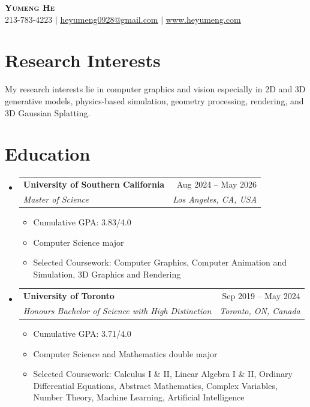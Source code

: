 \documentclass[letterpaper,11pt]{article}
\newcommand{\resumeItem}[1]{
  \item\small{
    {#1 \vspace{-2pt}}
  }
}
\newcommand{\resumeSubheading}[4]{
  \vspace{-2pt}\item
    \begin{tabularx}{\textwidth}[t]{X r}
      \textbf{#1} & #2 \\
      \textit{\small#3} & \textit{\small #4} \\
    \end{tabularx}\vspace{-7pt}
}
\newcommand{\resumeSubHeadingListStart}{\begin{itemize}[leftmargin=0in, label={}]}
\newcommand{\resumeSubHeadingListEnd}{\end{itemize}}
\newcommand{\resumeItemListStart}{\begin{itemize}}
\newcommand{\resumeItemListEnd}{\end{itemize}\vspace{-5pt}}
\begin{document}

\begin{center}
    \textbf{\Huge \scshape Yumeng He} \\ \vspace{1pt}
    \small 213-783-4223 $|$ \href{mailto:heyumeng0928@gmail.com}{\underline{heyumeng0928@gmail.com}} $|$ 
    \href{https://www.heyumeng.com} 
    {\underline{www.heyumeng.com}}
\end{center}

\section{Research Interests}
My research interests lie in computer graphics and vision especially in 
2D and 3D generative models, 
physics-based simulation, 
geometry processing,
rendering,
and 3D Gaussian Splatting.
\vspace{-2pt}

\section{Education}
  \resumeSubHeadingListStart
    \resumeSubheading{University of Southern California}{Aug 2024 -- May 2026}{Master of Science}{Los Angeles, CA, USA}
    \resumeItemListStart
      \resumeItem{Cumulative GPA: 3.83/4.0}
      \resumeItem{Computer Science major}
      \resumeItem{Selected Coursework: Computer Graphics, Computer Animation and Simulation, 3D Graphics and Rendering}
    \resumeItemListEnd
    \resumeSubheading{University of Toronto}{Sep 2019 -- May 2024}{Honours Bachelor of Science with High Distinction}{Toronto, ON, Canada}
    \resumeItemListStart
      \resumeItem{Cumulative GPA: 3.71/4.0}
      \resumeItem{Computer Science and Mathematics double major}
      \resumeItem{Selected Coursework: Calculus I \& II, Linear Algebra I \& II, Ordinary Differential Equations, Abstract Mathematics, Complex Variables, Number Theory, Machine Learning, Artificial Intelligence}
    \resumeItemListEnd
  \resumeSubHeadingListEnd
\end{document}
